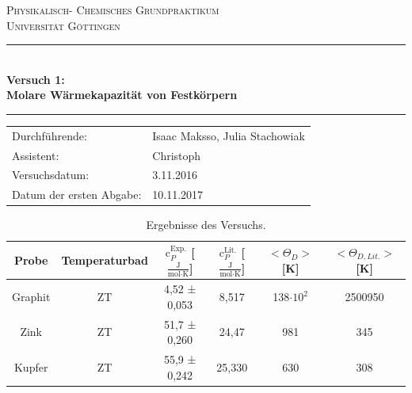 \documentclass[12pt,a4paper,titlepage,headinclude,bibtotoc]{scrartcl}
\begin{document}
\begin{titlepage}
\centering
\textsc{\Large Physikalisch- Chemisches Grundpraktikum\\[1.5ex] Universität Göttingen}

\vspace*{0.5cm}

\rule{\textwidth}{1pt}\\[0.5cm]
{\huge \bfseries
  Versuch 1: \\[1.5ex]
  Molare Wärmekapazität von Festkörpern }\\[0.5cm]
\rule{\textwidth}{1pt}

\vspace*{0.5cm}


\begin{Large}
\begin{tabular}{ll}
Durchführende: &  Isaac Maksso, Julia Stachowiak\\
Assistent: & Christoph \\
 Versuchsdatum: & 3.11.2016\\
 Datum der ersten Abgabe: & 10.11.2017\\
\end{tabular}
\end{Large}

\vspace*{0.5cm}


\begin{table}[h!]
\centering
\caption{Ergebnisse des Versuchs.}
\begin{tabular}{c|c|c|c||c|c}
Probe&Temperaturbad&$\text{c}_P^{\text{Exp.}}$ [$\frac{\text{J}}{\text{mol}\cdot\text{K}}$] &$\text{c}_P^{\text{Lit.}}$ [$\frac{\text{J}}{\text{mol}\cdot\text{K}}$] & $<\Theta_D >$ [K]& $<\Theta_{D,Lit.}>$ [K] \\
\hline
Graphit& ZT&4,52 ± 0,053  &8,517& 138$ \cdot 10^2$& 2500950\\
\hline
Zink &ZT& 51,7 ± 0,260 &24,47& 981 & 345\\
\hline
Kupfer &ZT&55,9 ± 0,242 &25,330& 630 &308\\
\end{tabular}
\end{table}
\end{titlepage}


\tableofcontents

\newpage
\end{document}
